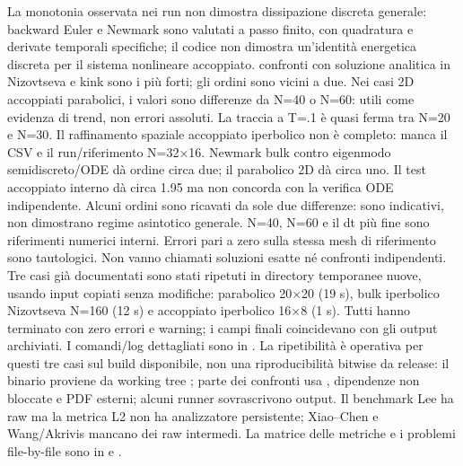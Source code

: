 {}La monotonia osservata nei run non dimostra dissipazione discreta generale: backward Euler e Newmark sono valutati a passo finito, con quadratura e derivate temporali specifiche; il codice non dimostra un’identità energetica discreta per il sistema nonlineare accoppiato.\markdownRendererInterblockSeparator
{}
\markdownRendererSectionEnd \markdownRendererSectionBegin
{}\markdownRendererInterblockSeparator
{} confronti con soluzione analitica in Nizovtseva e kink sono i più forti; gli ordini sono vicini a due. Nei casi 2D accoppiati parabolici, i valori sono differenze da N=40 o N=60: utili come evidenza di trend, non errori assoluti. La traccia a T=.1 è quasi ferma tra N=20 e N=30. Il raffinamento spaziale accoppiato iperbolico non è completo: manca il CSV e il run/riferimento N=32×16.\markdownRendererInterblockSeparator
{} Newmark bulk contro eigenmodo semidiscreto/ODE dà ordine circa due; il parabolico 2D dà circa uno. Il test accoppiato interno dà circa 1.95 ma non concorda con la verifica ODE indipendente. Alcuni ordini sono ricavati da sole due differenze: sono indicativi, non dimostrano regime asintotico generale.\markdownRendererInterblockSeparator
{} N=40, N=60 e il dt più fine sono riferimenti numerici interni. Errori pari a zero sulla stessa mesh di riferimento sono tautologici. Non vanno chiamati soluzioni esatte né confronti indipendenti.\markdownRendererInterblockSeparator
{}
\markdownRendererSectionEnd \markdownRendererSectionBegin
{}\markdownRendererInterblockSeparator
{}Tre casi già documentati sono stati ripetuti in directory temporanee nuove, usando input copiati senza modifiche: parabolico 20×20 (19 s), bulk iperbolico Nizovtseva N=160 (12 s) e accoppiato iperbolico 16×8 (1 s). Tutti hanno terminato con zero errori e warning; i campi finali coincidevano con gli output archiviati. I comandi/log dettagliati sono in .\markdownRendererInterblockSeparator
{}La ripetibilità è operativa per questi tre casi sul build disponibile, non una riproducibilità bitwise da release: il binario proviene da working tree ; parte dei confronti usa , dipendenze non bloccate e PDF esterni; alcuni runner sovrascrivono output. Il benchmark Lee ha raw ma la metrica L2 non ha analizzatore persistente; Xiao–Chen e Wang/Akrivis mancano dei raw intermedi. La matrice delle metriche e i problemi file-by-file sono in  e .\markdownRendererInterblockSeparator
